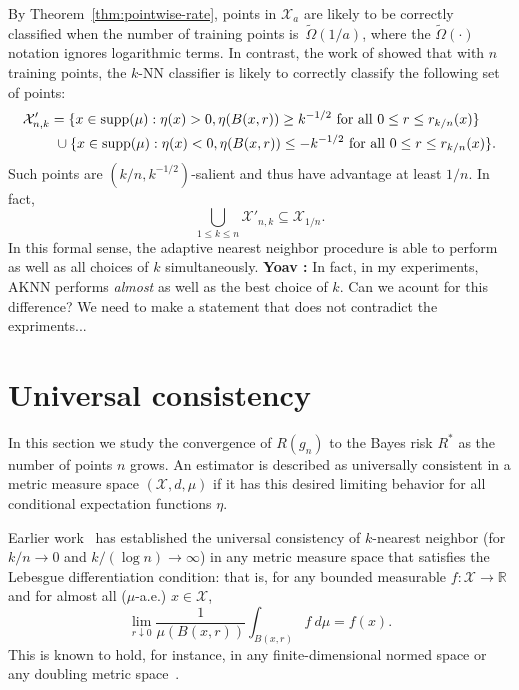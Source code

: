 \documentclass{article}
\def\R{{\mathbb{R}}}
\def\X{{\mathcal X}}
\def\supp{{\rm supp}}
\newcommand{\comment}[3]{{\color{#1} {\bf #2 :} #3}}
\newcommand{\yoav}[1]{\comment{cyan}{Yoav}{#1}}
\begin{document}
By Theorem~\ref{thm:pointwise-rate}, points in $\X_a$ are likely to be correctly classified when the number of training points is~$\widetilde{\Omega}(1/a)$, where the $\widetilde{\Omega}(\cdot)$ notation ignores logarithmic terms.
In contrast, the work of \cite{ChaudhuriDasgupta2014} showed that with $n$ training points, the $k$-NN classifier is likely to correctly classify the following set of points:
\begin{align*}
\X'_{n,k} &= \{x \in \supp(\mu): \eta(x) > 0, \eta(B(x,r)) \geq k^{-1/2} \mbox{\ for all $0 \leq r \leq r_{k/n}(x)$}\} \\
&\ \cup \{x \in \supp(\mu): \eta(x) < 0, \eta(B(x,r)) \leq -k^{-1/2} \mbox{\ for all $0 \leq r \leq r_{k/n}(x)$}\} .
\end{align*}
Such points are $(k/n, k^{-1/2})$-salient and thus have advantage at least $1/n$. In fact,
$$ \bigcup_{1 \leq k \leq n} \X'_{n,k} \subseteq \X_{1/n} .$$
In this formal sense, the adaptive nearest neighbor procedure is able to perform as well as all choices of $k$ simultaneously.
\yoav{In fact, in my experiments, AKNN performs {\em almost} as well
  as the best choice of $k$. Can we acount for this difference? We
  need to make a statement that does not contradict the expriments...}


\section{Universal consistency}\label{sec:gen2}
\label{sec:universal-consistency}

In this section we study the convergence of $R(g_n)$ to the Bayes risk $R^*$ as the number of points $n$ grows. An estimator is described as universally consistent in a metric measure space $(\X, d, \mu)$ if it has this desired limiting behavior for all conditional expectation functions $\eta$.

Earlier work~\cite{ChaudhuriDasgupta2014} has established the universal consistency of $k$-nearest neighbor (for $k/n \rightarrow 0$ and $k/(\log n) \rightarrow \infty$) in any metric measure space that satisfies the Lebesgue differentiation condition: that is, for any bounded measurable $f: \X \rightarrow \R$ and for almost all ($\mu$-a.e.) $x \in \X$,
\begin{equation}
\lim_{r \downarrow 0} \frac{1}{\mu(B(x,r))} \int_{B(x,r)} f \ d\mu = f(x) .
\label{eq:lebesgue-condition}
\end{equation}
This is known to hold, for instance, in any finite-dimensional normed space or any doubling metric space~\cite[Chapter 1]{H01}.
\end{document}
